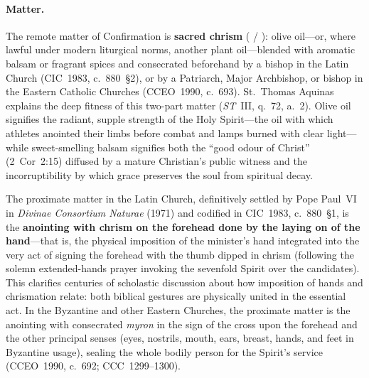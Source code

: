 \paragraph{Matter.}
The remote matter of Confirmation is \textbf{sacred chrism} ( / ): olive oil---or, where lawful under modern liturgical norms, another plant oil---blended with aromatic balsam or fragrant spices and consecrated beforehand by a bishop in the Latin Church (CIC~1983, c.~880~\S2), or by a Patriarch, Major Archbishop, or bishop in the Eastern Catholic Churches (CCEO~1990, c.~693). St.~Thomas Aquinas explains the deep fitness of this two-part matter (\emph{ST}~III, q.~72, a.~2). Olive oil signifies the radiant, supple strength of the Holy Spirit---the oil with which athletes anointed their limbs before combat and lamps burned with clear light---while sweet-smelling balsam signifies both the ``good odour of Christ'' (2~Cor~2:15) diffused by a mature Christian's public witness and the incorruptibility by which grace preserves the soul from spiritual decay.

The proximate matter in the Latin Church, definitively settled by Pope Paul~VI in \emph{Divinae Consortium Naturae} (1971) and codified in CIC~1983, c.~880~\S1, is the \textbf{anointing with chrism on the forehead done by the laying on of the hand}---that is, the physical imposition of the minister's hand integrated into the very act of signing the forehead with the thumb dipped in chrism (following the solemn extended-hands prayer invoking the sevenfold Spirit over the candidates). This clarifies centuries of scholastic discussion about how imposition of hands and chrismation relate: both biblical gestures are physically united in the essential act. In the Byzantine and other Eastern Churches, the proximate matter is the anointing with consecrated \emph{myron} in the sign of the cross upon the forehead and the other principal senses (eyes, nostrils, mouth, ears, breast, hands, and feet in Byzantine usage), sealing the whole bodily person for the Spirit's service (CCEO~1990, c.~692; CCC~1299--1300).

